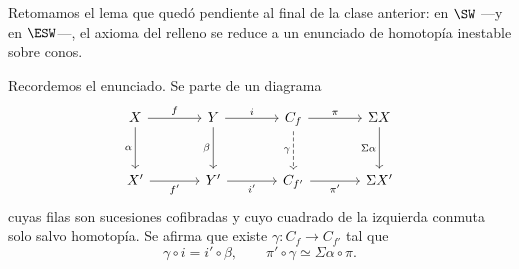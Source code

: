 Retomamos el lema que quedó pendiente al final de la clase anterior: en $\SW$ ---y en $\ESW$---, el axioma del relleno se reduce a un enunciado de homotopía inestable sobre conos.

Recordemos el enunciado. Se parte de un diagrama
\[
\begin{tikzcd}[column sep=large, row sep=large]
X \arrow[r,"f"] \arrow[d,"\alpha"'] & Y \arrow[r,"i"] \arrow[d,"\beta"'] & C_f \arrow[r,"\pi"] \arrow[d,dashed,"\gamma"'] & \Sigma X \arrow[d,"\Sigma\alpha"']\\
X' \arrow[r,"f'"'] & Y' \arrow[r,"i'"'] & C_{f'} \arrow[r,"\pi'"'] & \Sigma X'
\end{tikzcd}
\]
cuyas filas son sucesiones cofibradas y cuyo cuadrado de la izquierda conmuta solo salvo homotopía. Se afirma que existe $\gamma\colon C_f\to C_{f'}$ tal que
\[
\gamma\circ i=i'\circ\beta,
\qquad
\pi'\circ\gamma\simeq\Sigma\alpha\circ\pi .
\]


